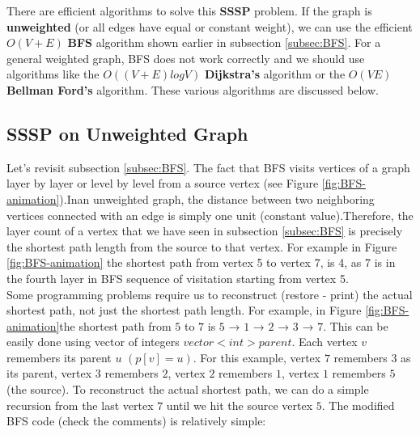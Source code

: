 \hspace{7mm}There are efficient algorithms to solve this \textbf{SSSP} problem. If the graph is \textbf{unweighted} (or all edges have equal or constant weight), we can use the efficient \textbf{$O(V + E)$} \textbf{BFS} algorithm shown earlier in subsection \ref{subsec:BFS}. For a general weighted graph, BFS does not work correctly and we should use algorithms like the {$O((V + E) log V )$} \textbf{Dijkstra’s} algorithm or the \textbf{$O(V E)$} \textbf{Bellman Ford’s} algorithm. These various algorithms are discussed below.

\subsection{SSSP on Unweighted Graph}\label{subsec:SSSP on Unweighted Graph}
Let’s revisit subsection \ref{subsec:BFS}. The fact that BFS visits vertices of a graph layer by layer or level by level from a source vertex (see Figure \ref{fig:BFS-animation}).Inan unweighted graph, the distance between two neighboring vertices connected with an edge is simply one unit (constant value).Therefore, the layer count of a vertex that we have seen in subsection \ref{subsec:BFS} is precisely the shortest path length from the source to that vertex. For example in Figure \ref{fig:BFS-animation} the shortest path from vertex 5 to vertex 7, is 4, as 7 is in the fourth layer in BFS sequence of visitation starting from vertex 5.\\
\indent Some programming problems require us to reconstruct (restore - print) the actual shortest path, not just the shortest path length. For example, in Figure \ref{fig:BFS-animation}the shortest path from $5$ to $7$ is $5$ → $1$ → $2$ → $3$ → $7$. This can be easily done using vector of integers $vector<int> parent$. Each vertex $v$ remembers its parent $u$ $(p[v] = u)$.  For this example, vertex $7$ remembers $3$ as its parent, vertex $3$ remembers $2$, vertex $2$ remembers $1$, vertex $1$ remembers $5$ (the source). To reconstruct the actual shortest path, we can do a simple recursion from the last vertex $7$ until we hit the source vertex $5$. The modified BFS code (check the comments) is relatively simple:

